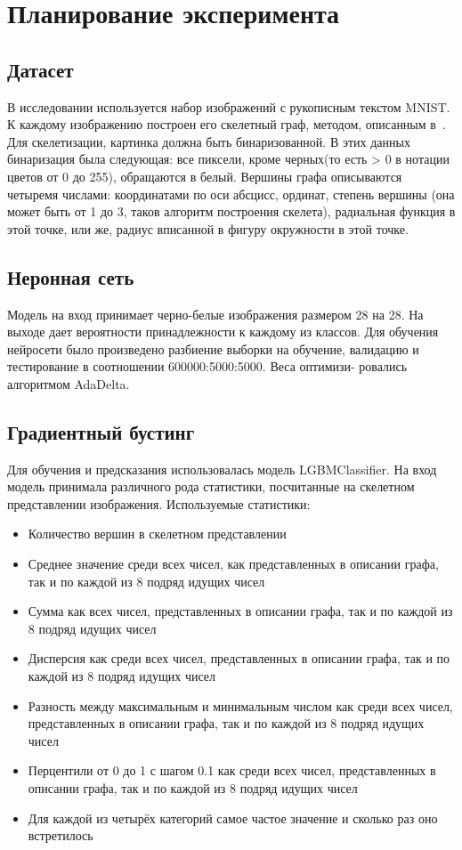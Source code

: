 \documentclass{llncs}
\begin{document}
\section{Планирование эксперимента}
\subsection{Датасет}
В исследовании используется набор изображений с рукописным текстом MNIST.
К каждому изображению построен его скелетный граф, методом, описанным в~\cite{graphs_gen}. Для скелетизации, картинка должна быть бинаризованной. В этих данных бинаризация была следующая: все пиксели, кроме черных(то есть > 0 в нотации цветов от 0 до 255), обращаются в белый. Вершины графа описываются четыремя числами: координатами по оси абсцисс, ординат, степень вершины (она может быть от 1 до 3, таков алгоритм построения скелета), радиальная функция в этой точке, или же, радиус вписанной в фигуру окружности в этой точке.

\subsection{Неронная сеть}
Модель на вход принимает черно-белые изображения размером 28 на 28. На выходе дает вероятности принадлежности к каждому из классов. Для обучения нейросети было произведено разбиение выборки на обучение,
валидацию и тестирование в соотношении 600000:5000:5000. Веса оптимизи-
ровались алгоритмом AdaDelta.

\subsection{Градиентный бустинг}
Для обучения и предсказания использовалась модель LGBMClassifier.
На вход модель принимала различного рода статистики, посчитанные на скелетном представлении изображения.
Используемые статистики:
\begin{itemize}
    \item Количество вершин в скелетном представлении
    \item Среднее значение среди всех чисел, как представленных в описании графа, так и по каждой из 8 подряд идущих чисел
    \item Сумма как всех чисел, представленных в описании графа, так и по каждой из 8 подряд идущих чисел
    \item Дисперсия как среди всех чисел, представленных в описании графа, так и по каждой из 8 подряд идущих чисел
    \item Разность между максимальным и минимальным числом как среди всех чисел, представленных в описании графа, так и по каждой из 8 подряд идущих чисел
    \item Перцентили от 0 до 1 с шагом 0.1 как среди всех чисел, представленных в описании графа, так и по каждой из 8 подряд идущих чисел
    \item Для каждой из четырёх категорий самое частое значение и сколько раз оно встретилось
\end{itemize}
\end{document}
